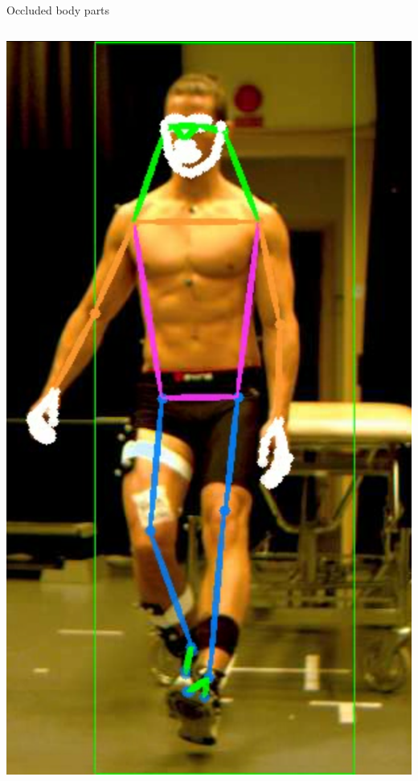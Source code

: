 \begin{frame}[fragile]{Occluded body parts}
\begin{columns}[T,onlytextwidth]
      \includegraphics[height=0.74\textheight]{files/figs/res/hpe/36-6.png}

\end{columns}
\end{frame}
